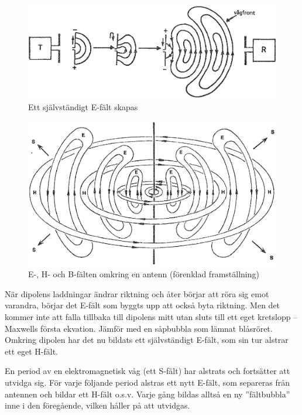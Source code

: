 \begin{figure}
\includegraphics[width=\textwidth]{images/cropped_pdfs/bild_2_7-04.pdf}
\caption{Ett självständigt E-fält skapas}
\label{fig:BildII7-04}
\end{figure}

\begin{figure}
\includegraphics[width=\textwidth]{images/cropped_pdfs/bild_2_7-05.pdf}
\caption{E-, H- och B-fälten omkring en antenn (förenklad framställning)}
\label{fig:BildII7-05}
\end{figure}

När dipolens laddningar ändrar riktning och åter börjar att röra sig
emot varandra, börjar det E-fält som byggts upp att också byta
riktning. Men det kommer inte att falla tillbaka till dipolens mitt
utan sluts till ett eget kretslopp -- Maxwells första ekvation.
Jämför med en såpbubbla som lämnat blåsröret.
Omkring dipolen har det nu bildats ett självständigt E-fält, som sin tur
alstrar ett eget H-fält.

En period av en elektromagnetisk våg (ett S-fält) har alstrats och
fortsätter att utvidga sig. För varje följande period alstras ett nytt E-fält,
som separeras från antennen och bildar ett H-fält o.s.v. Varje gång bildas alltså en ny ''fältbubbla'' inne i den föregående, vilken håller på att utvidgas.

